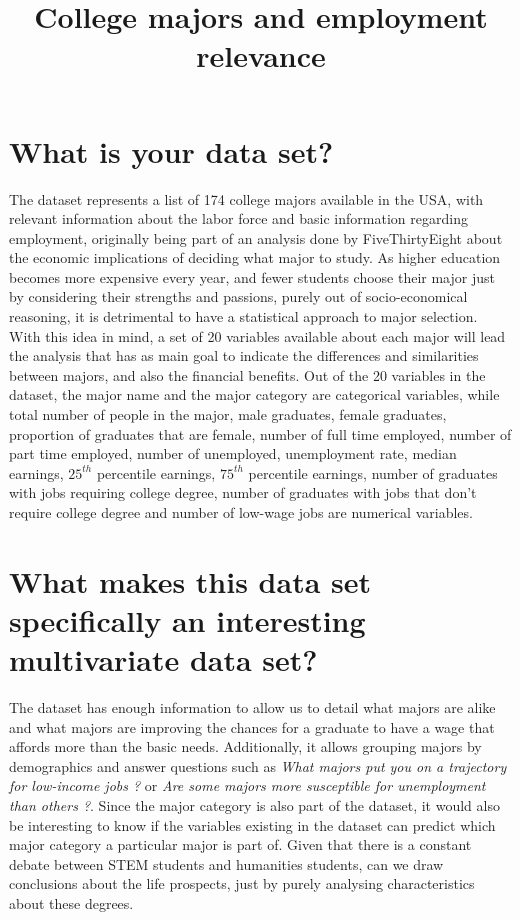 \documentclass[11pt,a4paper]{article}
\date{}
\title{College majors and employment relevance}
\begin{document}
\newpage
\maketitle

\section*{What is your data set?}
The dataset represents a list of 174 college majors available in the USA, with relevant information about the labor force and basic information regarding employment, originally being part of an analysis done by FiveThirtyEight \cite{fiveThirty} about the economic implications of deciding what major to study. As higher education becomes more expensive every year, and fewer students choose their major just by considering their strengths and passions, purely out of socio-economical reasoning, it is detrimental to have a statistical approach to major selection. With this idea in mind, a set of 20 variables available about each major will lead the analysis that has as main goal to indicate the differences and similarities between majors, and also the financial benefits. Out of the 20 variables in the dataset, the major name and the major category are categorical variables, while total number of people in the major, male graduates, female graduates, proportion of graduates that are female, number of full time employed, number of part time employed, number of unemployed, unemployment rate, median earnings, $25^{th}$ percentile earnings, $75^{th}$ percentile earnings, number of graduates with jobs requiring college degree, number of graduates with jobs that don't require college degree and number of low-wage jobs are numerical variables.
\section*{What makes this data set specifically an interesting multivariate data set?}
The dataset has enough information to allow us to detail what majors are alike and what majors are improving the chances for a graduate to have a wage that affords more than the basic needs. Additionally, it allows grouping majors by demographics and answer questions such as \textit{What majors put you on a trajectory for low-income jobs ?} or \textit{Are some majors more susceptible for unemployment than others ?}. Since the major category is also part of the dataset, it would also be interesting to know if the variables existing in the dataset can predict which major category a particular major is part of. Given that there is a constant debate between STEM students and humanities students, can we draw conclusions about the life prospects, just by purely analysing characteristics about these degrees.
\end{document}
